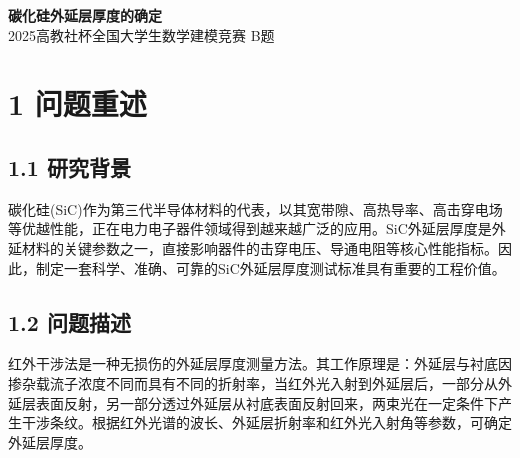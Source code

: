 \documentclass[12pt,a4paper]{article}
\begin{document}
\begin{center}
\LARGE\textbf{碳化硅外延层厚度的确定}\\[0.5em]
\small 2025高教社杯全国大学生数学建模竞赛 B题\\
\end{center}

\begin{abstract}
本研究针对碳化硅(SiC)外延层厚度测量问题，基于红外干涉光谱法建立了完整的数学模型并实现了精确测量。针对问题1，建立了考虑外延层与衬底界面单次反射的双光束干涉模型，推导了厚度计算公式$d=1/(2n\Delta\sigma)$；针对问题2，设计了基于峰值检测和统计分析的厚度求解算法，对附件1、附件2的SiC晶圆片进行计算，得到SiC-1厚度为$24.58\,\mu\text{m}$，SiC-2厚度为$24.02\,\mu\text{m}$；针对问题3，深入分析了多光束Fabry-Perot干涉产生的必要条件，发现Si样品的干涉条纹对比度$K>0.99$，确认存在显著多光束干涉效应，而SiC样品$K\approx0.98$，表明其多光束效应相对较弱。对Si样品的分析得到Si-1厚度为$3.67\,\mu\text{m}$，Si-2厚度为$3.52\,\mu\text{m}$。研究结果表明，所建立的模型和算法能够有效测定SiC和Si外延层厚度，为半导体外延材料的无损检测提供了科学依据。

\textbf{关键词}: 红外干涉；外延层厚度；双光束干涉；多光束干涉；Fabry-Perot干涉仪；Sellmeier色散公式
\end{abstract}

\section{1 问题重述}

\subsection{1.1 研究背景}
碳化硅(SiC)作为第三代半导体材料的代表，以其宽带隙、高热导率、高击穿电场等优越性能，正在电力电子器件领域得到越来越广泛的应用。SiC外延层厚度是外延材料的关键参数之一，直接影响器件的击穿电压、导通电阻等核心性能指标。因此，制定一套科学、准确、可靠的SiC外延层厚度测试标准具有重要的工程价值。

\subsection{1.2 问题描述}
红外干涉法是一种无损伤的外延层厚度测量方法。其工作原理是：外延层与衬底因掺杂载流子浓度不同而具有不同的折射率，当红外光入射到外延层后，一部分从外延层表面反射，另一部分透过外延层从衬底表面反射回来，两束光在一定条件下产生干涉条纹。根据红外光谱的波长、外延层折射率和红外光入射角等参数，可确定外延层厚度。
\end{document}
